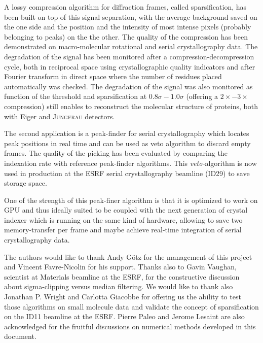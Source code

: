 \documentclass[preprint]{iucr}              %
\begin{document}
A lossy compression algorithm for diffraction frames, called sparsification, has been built on top of this signal separation, with the average background saved on the one side and the position and the intensity of most intense pixels (probably belonging to peaks) on the the other.
The quality of the compression has been demonstrated on macro-molecular rotational and serial crystallography data. 
The degradation of the signal has been monitored after a compression-decompression cycle, both in reciprocal space using crystallographic quality indicators and after Fourier transform in direct space where the number of residues placed automatically was checked.
The degradation of the signal was also monitored as function of the threshold and sparsification at $0.8\sigma-1.0\sigma$ (offering a $2\times-3\times$ compression) still enables to reconstruct the molecular structure of proteins, both with Eiger and \textsc{Jungfrau} detectors.

The second application is a peak-finder for serial crystallography which locates peak positions in real time and can be used as veto algorithm to discard empty frames. 
The quality of the picking has been evaluated by comparing the indexation rate with reference peak-finder algorithms. 
This \textit{veto-}algorithm is now used in production at the ESRF serial crystallography beamline (ID29) to save storage space.

One of the strength of this peak-finer algorithm is that it is optimized to work on GPU and thus ideally suited to be coupled with the next generation of crystal indexer \cite{toro} which is running on the same kind of hardware, allowing to save two memory-transfer per frame and maybe achieve real-time integration of serial crystallography data.



The authors would like to thank Andy G\"otz for the management of this project and Vincent Favre-Nicolin for his support.
Thanks also to Gavin Vaughan, scientist at Materials beamline at the ESRF,  for the constructive discussion about sigma-clipping versus median filtering.
We would like to thank also Jonathan P. Wright and Carlotta Giacobbe for offering us the ability to test those algorithms on small molecule data and validate the concept of sparsification on the ID11 beamline at the ESRF.
Pierre Paleo and Jerome Lesaint are also acknowledged for the fruitful discussions on numerical methods developed in this document.



\end{document}
